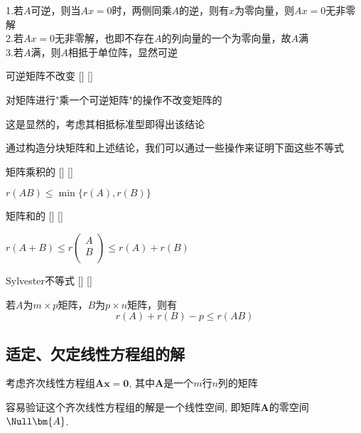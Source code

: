 \documentclass[UTF8]{ctexart}
\begin{document}
        \begin{prf}
            1.若$A$可逆，则当$Ax=0$时，两侧同乘$A$的逆，则有$x$为零向量，则$Ax=0$无非零解\\
            2.若$Ax=0$无非零解，也即不存在$A$的列向量的一个 为零向量，故$A$满\秩\\
            3.若$A$满\秩，则$A$相抵于单位阵，显然可逆
        \end{prf}
        
	    \begin{ppt}
			[]
			{可逆矩阵不改变\秩}
			[]
			[]

            对矩阵进行"乘一个可逆矩阵"的操作不改变矩阵的\秩
        \end{ppt}
        \begin{prf}
            这是显然的，考虑其相抵标准型即得出该结论
        \end{prf}
        通过构造分块矩阵和上述结论，我们可以通过一些操作来证明下面这些\秩 不等式
        \begin{thm}
			[]
			{矩阵乘积的\秩}
			[]
			[]

            $r(AB)\leq \min\{r(A),r(B)\}$
        \end{thm}
        \begin{thm}
			[]
			{矩阵和的\秩}
			[]
			[]

            $r(A + B) \leq r\begin{pmatrix} A \\ B \\ \end{pmatrix} \leq r(A) + r(B)$
        \end{thm}

        \begin{thm}
			[]
			{Sylvester不等式}
			[]
			[]
        
            若$A$为$m\times p$矩阵，$B$为$p\times n$矩阵，则有
            \[r(A)+r(B)-p\leq r(AB)\]
        \end{thm}
	\subsection{适定、欠定线性方程组的解}

		考虑齐次线性方程组$\bm{A}\bm{x}=\mathbf{0}$, 其中$\bm{A}$是一个$m$行$n$列的矩阵

		容易验证这个齐次线性方程组的解是一个线性空间, 即矩阵$\bm{A}$的零空间$\Null\bm{A}$. 
\end{document}
